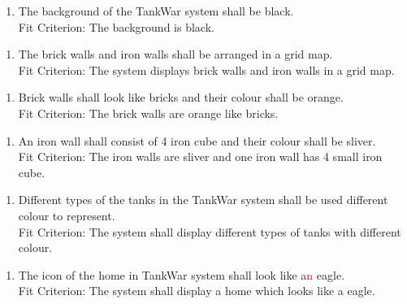 \documentclass[12pt, titlepage]{article}
\begin{document}
\begin{enumerate}[{LF}2. ]
	\item The background of the TankWar system shall be black.
	\\
	
	Fit Criterion: The background is black.
\end{enumerate}

\begin{enumerate}[{LF}3. ]
	\item The brick walls and iron walls shall be arranged in a grid map. 
	\\
	
	Fit Criterion: The system displays brick walls and iron walls in a grid map. 
\end{enumerate}

\begin{enumerate}[{LF}4. ]
	\item Brick walls shall look like bricks and their colour shall be orange.
	\\
	
	Fit Criterion: The brick walls are orange like bricks. 
\end{enumerate}

\begin{enumerate}[{LF}5. ]
	\item An iron wall shall consist of 4 iron cube and their colour shall be sliver.
	\\
	
	Fit Criterion: The iron walls are sliver and one iron wall has 4 small iron cube.
\end{enumerate}

\begin{enumerate}[{LF}6. ]
	\item Different types of the tanks in the TankWar system shall be used different colour to represent.
	\\
	
	Fit Criterion: The system shall display different types of tanks with different colour.
\end{enumerate}

\begin{enumerate}[{LF}7. ]
	\item The icon of the home in TankWar system shall look like a\textcolor{red}{n} eagle.
	\\
	
	Fit Criterion: The system shall display a home which looks like a eagle.
\end{enumerate}
\end{document}
